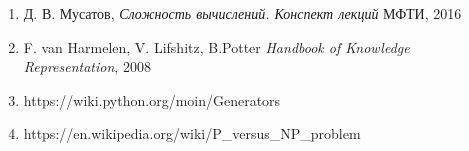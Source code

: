 \documentclass[paper=a4, fontsize=11pt]{scrartcl}
\begin{document}
\begin{enumerate}
\item Д. В. Мусатов, \textit{Сложность вычислений. Конспект лекций}
МФТИ, 2016

\item F. van Harmelen, V. Lifshitz, B.Potter
    \textit{Handbook of Knowledge Representation}, 2008

\item https://wiki.python.org/moin/Generators

\item https://en.wikipedia.org/wiki/P\_versus\_NP\_problem

\end{enumerate}
\end{document}
